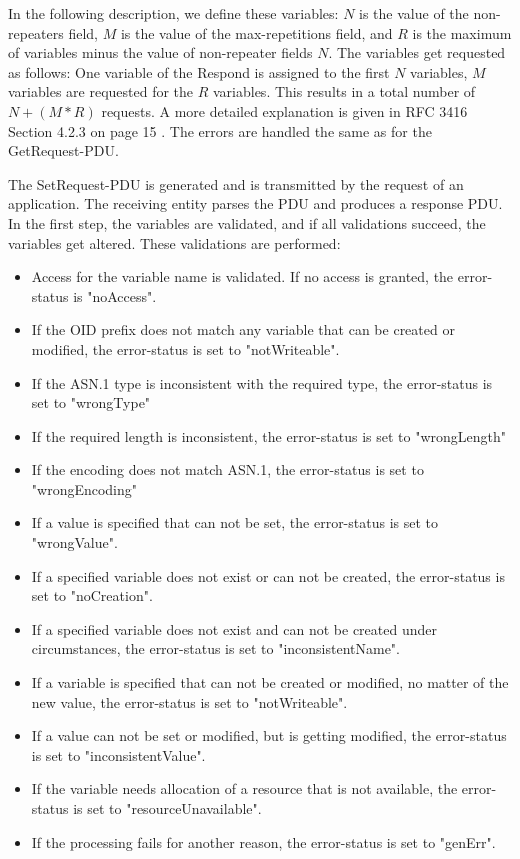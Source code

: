 In the following description, we define these variables: $N$ is the value of the non-repeaters field, $M$ is the value of the max-repetitions field, and $R$ is the maximum of variables minus the value of non-repeater fields $N$. The variables get requested as follows: One variable of the Respond is assigned to the first $N$ variables, $M$ variables are requested for the $R$ variables. This results in a total number of $N + (M * R)$ requests. A more detailed explanation is given in RFC 3416 Section 4.2.3 on page 15 \cite{RFC:RFC3416:2002}. The errors are handled the same as for the GetRequest-PDU.

\newpage
The SetRequest-PDU is generated and is transmitted by the request of an application. The receiving entity parses the PDU and produces a response PDU. In the first step, the variables are validated, and if all validations succeed, the variables get altered. These validations are performed:

\begin{itemize}
    \item Access for the variable name is validated. If no access is granted, the error-status is "noAccess".
    \item If the OID prefix does not match any variable that can be created or modified, the error-status is set to "notWriteable".
    \item If the ASN.1 type is inconsistent with the required type, the error-status is set to "wrongType"
    \item If the required length is inconsistent, the error-status is set to "wrongLength"
    \item If the encoding does not match ASN.1, the error-status is set to "wrongEncoding"
    \item If a value is specified that can not be set, the error-status is set to "wrongValue".
    \item If a specified variable does not exist or can not be created, the error-status is set to "noCreation".
    \item If a specified variable does not exist and can not be created under circumstances, the error-status is set to "inconsistentName".
    \item If a variable is specified that can not be created or modified, no matter of the new value, the error-status is set to "notWriteable".
    \item If a value can not be set or modified, but is getting modified, the error-status is set to "inconsistentValue".
    \item If the variable needs allocation of a resource that is not available, the error-status is set to "resourceUnavailable".
    \item If the processing fails for another reason, the error-status is set to "genErr".
\end{itemize}

